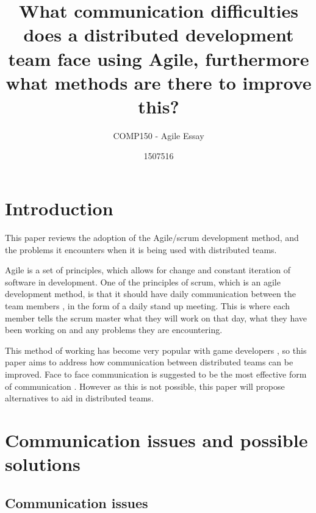\documentclass{scrartcl}
\title{What communication difficulties does a distributed development team face using Agile, furthermore what methods are there to improve this?}
\subtitle{COMP150 - Agile Essay}
\author{1507516}
\begin{document}
\maketitle


\section{Introduction}

This paper reviews the adoption of the Agile/scrum development method, and the problems it encounters when it is being used with distributed teams.

Agile is a set of principles, which allows for change and constant iteration of software in development. One of the principles of scrum, which is an agile development method, is that it should have daily communication between the team members \cite{abdullah2011}, in the form of a daily stand up meeting. This is where each member tells the scrum master what they will work on that day, what they have been working on and any problems they are encountering. 

This method of working has become very popular with game developers \cite{campbell2016}, so this paper aims to address how communication between distributed teams can be improved. 
Face to face communication is suggested to be the most effective form of communication \cite{joshi2013}. However as this is not possible, this paper will propose alternatives to aid in distributed teams.









\section{Communication issues and possible solutions}
\subsection{Communication issues}
\end{document}
